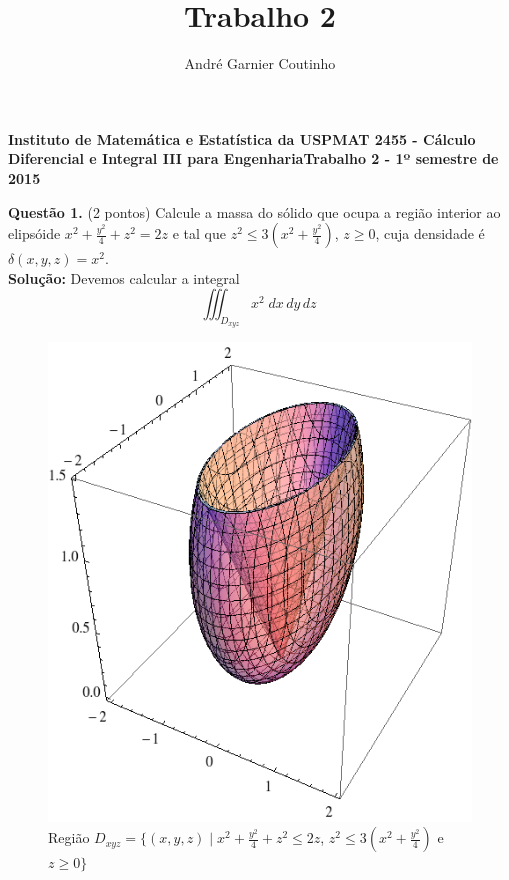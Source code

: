 \documentclass[12pt,a4paper]{article}
\title{Trabalho 2}
\author{André Garnier Coutinho}
\begin{document}
\begin{center}
\textbf{Instituto de Matemática e Estatística da USP\linebreak MAT 2455 - Cálculo Diferencial e Integral III para Engenharia\linebreak Trabalho 2 - 1º semestre de 2015}
\end{center}


\textbf{Quest\~{a}o 1.} (2 pontos) Calcule a massa do sólido que ocupa a região interior ao elipsóide $x^2 + \frac{y^ 2}{4} + z^2 = 2z$ e tal que $z^2 \leq 3(x^2 + \frac{y^2}{4})$, $z \geq 0$, cuja densidade é $\delta(x,y,z) = x^2$. \\

\textbf{Solução:}
\linebreak
Devemos calcular a integral
\begin{equation}
 \iiint_{D_{xyz}}{x^2}\;dx\,dy\,dz \
\label{eq:integral}
\end{equation}

\begin{figure}[h!]
	\centering
	\includegraphics[scale=0.3]{Fig1.png}  
	\caption{Regi\~{a}o $ D_{xyz} = \lbrace(x, y, z)\mid x^2 + \frac{y^ 2}{4} + z^2 \leq 2z $, $z^2 \leq 3(x^2 + \frac{y^2}{4}) $ e $ z \geq 0 \rbrace $}
	\label{fig:figura1}
\end{figure}
\end{document}
